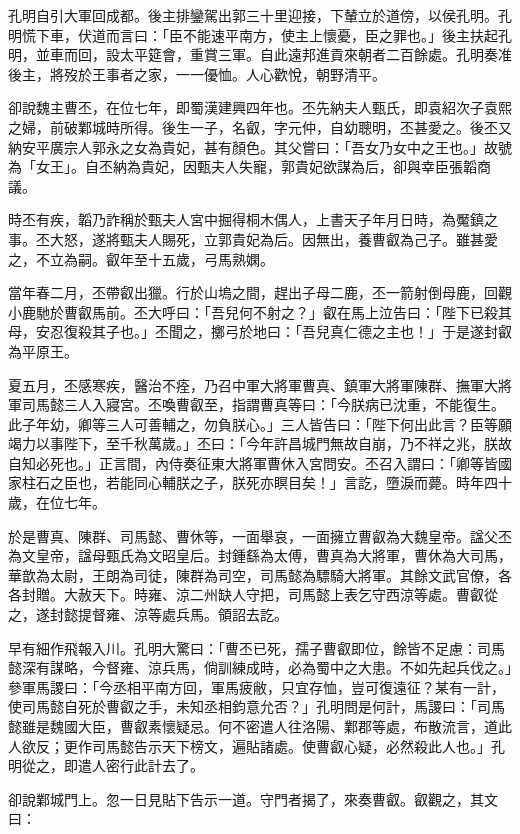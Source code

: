 孔明自引大軍回成都。後主排鑾駕出郭三十里迎接，下輦立於道傍，以侯孔明。孔明慌下車，伏道而言曰：「臣不能速平南方，使主上懷憂，臣之罪也。」後主扶起孔明，並車而回，設太平筵會，重賞三軍。自此遠邦進貢來朝者二百餘處。孔明奏准後主，將歿於王事者之家，一一優恤。人心歡悅，朝野清平。

卻說魏主曹丕，在位七年，即蜀漢建興四年也。丕先納夫人甄氏，即袁紹次子袁熙之婦，前破鄴城時所得。後生一子，名叡，字元仲，自幼聰明，丕甚愛之。後丕又納安平廣宗人郭永之女為貴妃，甚有顏色。其父嘗曰：「吾女乃女中之王也。」故號為「女王」。自丕納為貴妃，因甄夫人失寵，郭貴妃欲謀為后，卻與幸臣張韜商議。

時丕有疾，韜乃詐稱於甄夫人宮中掘得桐木偶人，上書天子年月日時，為魘鎮之事。丕大怒，遂將甄夫人賜死，立郭貴妃為后。因無出，養曹叡為己子。雖甚愛之，不立為嗣。叡年至十五歲，弓馬熟嫻。

當年春二月，丕帶叡出獵。行於山塢之間，趕出子母二鹿，丕一箭射倒母鹿，回觀小鹿馳於曹叡馬前。丕大呼曰：「吾兒何不射之？」叡在馬上泣告曰：「陛下已殺其母，安忍復殺其子也。」丕聞之，擲弓於地曰：「吾兒真仁德之主也！」于是遂封叡為平原王。

夏五月，丕感寒疾，醫治不痊，乃召中軍大將軍曹真、鎮軍大將軍陳群、撫軍大將軍司馬懿三人入寢宮。丕喚曹叡至，指謂曹真等曰：「今朕病已沈重，不能復生。此子年幼，卿等三人可善輔之，勿負朕心。」三人皆告曰：「陛下何出此言？臣等願竭力以事陛下，至千秋萬歲。」丕曰：「今年許昌城門無故自崩，乃不祥之兆，朕故自知必死也。」正言間，內侍奏征東大將軍曹休入宮問安。丕召入謂曰：「卿等皆國家柱石之臣也，若能同心輔朕之子，朕死亦瞑目矣！」言訖，墮淚而薨。時年四十歲，在位七年。

於是曹真、陳群、司馬懿、曹休等，一面舉哀，一面擁立曹叡為大魏皇帝。諡父丕為文皇帝，諡母甄氏為文昭皇后。封鍾繇為太傅，曹真為大將軍，曹休為大司馬，華歆為太尉，王朗為司徒，陳群為司空，司馬懿為驃騎大將軍。其餘文武官僚，各各封贈。大赦天下。時雍、涼二州缺人守把，司馬懿上表乞守西涼等處。曹叡從之，遂封懿提督雍、涼等處兵馬。領詔去訖。

早有細作飛報入川。孔明大驚曰：「曹丕已死，孺子曹叡即位，餘皆不足慮：司馬懿深有謀略，今督雍、涼兵馬，倘訓練成時，必為蜀中之大患。不如先起兵伐之。」參軍馬謖曰：「今丞相平南方回，軍馬疲敝，只宜存恤，豈可復遠征？某有一計，使司馬懿自死於曹叡之手，未知丞相鈞意允否？」孔明問是何計，馬謖曰：「司馬懿雖是魏國大臣，曹叡素懷疑忌。何不密遣人往洛陽、鄴郡等處，布散流言，道此人欲反；更作司馬懿告示天下榜文，遍貼諸處。使曹叡心疑，必然殺此人也。」孔明從之，即遣人密行此計去了。

卻說鄴城門上。忽一日見貼下告示一道。守門者揭了，來奏曹叡。叡觀之，其文曰：

